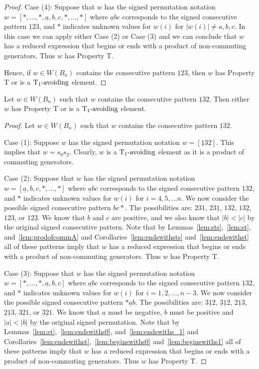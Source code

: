 \begin{lemma}
\begin{proof}
	Case (4): Suppose that $w$ has the signed permutation notation $w=[\ast, \ldots, \ast, \underline{a},b,c, \ast, \ldots, \ast]$ where $\underline{a}bc$ corresponds to the signed consecutive pattern $\underline{1}23$, and $\ast$ indicates unknown values for $w(i)$ for $|w(i)|\neq a,b,c$. In this case we can apply either Case (2) or Case (3) and we can conclude that $w$ has a reduced expression that begins or ends with a product of non-commuting generators. Thus $w$ has Property T.

	Hence, if $w \in W(B_n)$ contains the consecutive pattern $\underline{1}23$, then $w$ has Property T or is a $\operatorname{T_1-\mathrm{avoiding}}$ element.
\end{proof}	
\end{lemma}

\begin{lemma}\label{lem:132}
Let $w \in W(B_n)$ such that $w$ contains the consecutive pattern $\underline{1}32$. Then either $w$ has Property T or is a $\operatorname{T_1-\mathrm{avoiding}}$ element.
\begin{proof}
	Let $w \in W(B_n)$ such that $w$ contains the consecutive pattern $\underline{1}32$.
	
	Case (1): Suppose $w$ has the signed permutation notation $w=[\underline{1}32]$. This implies that $w=s_0s_2$. Clearly, $w$ is a $\operatorname{T_1-\mathrm{avoiding}}$ element as it is a product of commuting generators.
	
	Case (2): Suppose that $w$ has the signed permutation notation $w=[\underline{a},b,c, \ast, \ldots, \ast]$ where $\underline{a}bc$ corresponds to the signed consecutive pattern $\underline{1}32$, and $\ast$ indicates unknown values for $w(i)$ for $i=4,5, \ldots n$. We now consider the possible signed consecutive pattern $bc \ast$. The possibilities are: $231$, $23 \underline{1}$, $13 2$, $13 \underline{2}$, $123$, or $12\underline{3}$. We know that $b$ and $c$ are positive, and we also know that $|b|<|c|$ by the original signed consecutive pattern. Note that by Lemmas~\ref{lem:sts},~\ref{lem:st}, and~\ref{lem:prodofcommA} and Corollaries~\ref{lem:endswithsts} and~\ref{lem:endswithst} all of these patterns imply that $w$ has a reduced expression that begins or ends with a product of non-commuting generators. Thus $w$ has Property T.
	
	Case (3): Suppose that $w$ has the signed permutation notation $w=[\ast, \ldots, \ast, \underline{a},b,c]$ where $\underline{a}bc$ corresponds to the signed consecutive pattern $\underline{1}32$, and $\ast$ indicates unknown values for $w(i)$ for $i=1,2, \ldots ,n-3$. We now consider the possible signed consecutive pattern $\ast \underline{a} b$. The possibilities are: $3 \underline{1} 2$, $\underline{3} \underline{1} 2$, $2 \underline{1} 3$, $\underline{2} \underline{1} 3$, $3 \underline{2} 1$, or $\underline{3} \underline{2} 1$. We know that $a$ must be negative, $b$ must be positive and $|a|<|b|$ by the original signed permutation. Note that by Lemmas~\ref{lem:st},~\ref{lem:endswiths0}, and~\ref{lem:endswiths_1} and Corollaries~\ref{lem:endswithst},~\ref{lem:beginswiths0} and~\ref{lem:beginswiths1} all of these patterns imply that $w$ has a reduced expression that begins or ends with a product of non-commuting generators. Thus $w$ has Property T. 
	

\end{proof}
\end{lemma}
